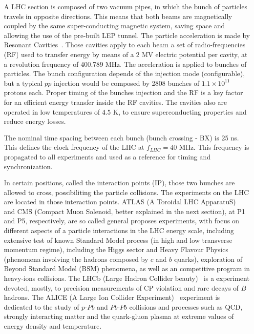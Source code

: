 A LHC section is composed of two vacuum pipes, in which the bunch of particles travels in opposite directions. This means that both beams are magnetically coupled by the same super-conducting magnetic system, saving space and allowing the use of the pre-built LEP tunnel. The particle acceleration is made by Resonant Cavities~\cite{Baird:1017689}. Those cavities apply to each beam a set of radio-frequencies (RF) used to transfer energy by means of a 2 MV electric potential per cavity, at a revolution frequency of 400.789 MHz. The acceleration is applied to bunches of particles. The bunch configuration depends of the injection mode (configurable), but a typical $pp$ injection would be composed by 2808 bunches of $1.1 \times 10^{11}$ protons each. Proper timing of the bunches injection and the RF is a key factor for an efficient energy transfer inside the RF cavities. The cavities also are operated in low temperatures of 4.5 K, to ensure superconducting properties and reduce energy losses.

The nominal time spacing between each bunch (bunch crossing - BX) is 25 ns. This defines the clock frequency of the LHC at $f_{LHC} = 40$ MHz. This frequency is propagated to all experiments and used as a reference for timing and synchronization. 

In certain positions, called the interaction points (IP), those two bunches are allowed to cross, possibiliting the particle collisions. The experiments on the LHC are located in those interaction points. ATLAS (A Toroidal LHC ApparatuS)~\cite{atlas_collaboration_2008} and CMS (Compact Muon Solenoid, better explained in the next section), at P1 and P5, respectively, are so called general proposes experiments, with focus on different aspects of a particle interactions in the LHC energy scale, including extensive test of known Standard Model process (in high and low transverse momentum regime), including the Higgs sector and Heavy Flavour Physics (phenomena involving the hadrons composed by $c$ and $b$ quarks), exploration of Beyond Standard Model (BSM) phenomena, as well as an competitive program in heavy-ions collisions. The LHCb (Large Hadron Collider beauty)~\cite{Alves:2008zz} is a experiment devoted, mostly, to precision measurements of CP violation and rare decays of $B$ hadrons. The ALICE (A Large Ion Collider Experiment)~\cite{Aamodt:2008zz} experiment is dedicated to the study of $p$-$Pb$ and $Pb$-$Pb$ collisions and processes such as QCD, strongly interacting matter and the quark-gluon plasma at extreme values of energy density and temperature.

